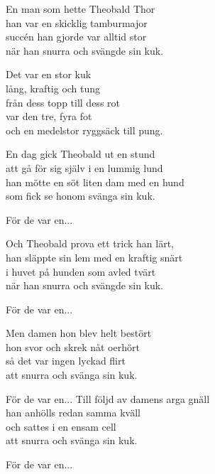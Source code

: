 \vspace{10pt}
En man som hette Theobald Thor\\
han var en skicklig tamburmajor\\
succén han gjorde var alltid stor\\
när han snurra och svängde sin kuk.\par
\vspace{10pt}
Det var en stor kuk\\
lång, kraftig och tung\\
från dess topp till dess rot\\
var den tre, fyra fot\\
och en medelstor ryggsäck till pung.\par
\vspace{10pt}
En dag gick Theobald ut en stund\\
att gå för sig själv i en lummig lund\\
han mötte en söt liten dam med en hund\\
som fick se honom svänga sin kuk.\par
\vspace{8pt}
För de var en...\par
\vspace{8pt}
Och Theobald prova ett trick han lärt,\\
han släppte sin lem med en kraftig snärt\\
i huvet på hunden som avled tvärt\\
när han snurra och svängde sin kuk.\par
\vspace{8pt}
För de var en...\par
\vspace{8pt}
Men damen hon blev helt bestört\\
hon svor och skrek nåt oerhört\\
så det var ingen lyckad flirt\\
att snurra och svänga sin kuk.\par
\vspace{8pt}
För de var en...
\newpage
Till följd av damens arga gnäll\\
han anhölls redan samma kväll\\
och sattes i en ensam cell\\
att snurra och svänga sin kuk.\par
\vspace{8pt}
För de var en...\par
